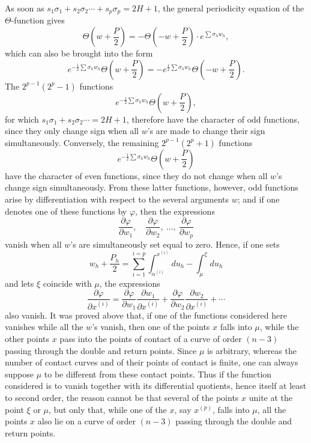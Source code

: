 \documentclass[10pt]{article}
\begin{document}
As soon as \(s_1\sigma_1+s_2\sigma_2\cdots+s_p\sigma_p=2H+1\), the general periodicity equation of the \(\Theta\)-function gives
\[
\Theta\left(w+\frac P2\right)
=-\Theta\left(-w+\frac P2\right)\cdot e^{\sum\sigma_h w_h},
\]
which can also be brought into the form
\[
e^{-\frac12\sum\sigma_h w_h}\Theta\left(w+\frac P2\right)
=
-e^{\frac12\sum\sigma_h w_h}\Theta\left(-w+\frac P2\right).
\]
The \(2^{p-1}(2^p-1)\) functions
\[
e^{-\frac12\sum\sigma_h w_h}\Theta\left(w+\frac P2\right),
\]
for which \(s_1\sigma_1+s_2\sigma_2\cdots=2H+1\), therefore have the character of odd functions, since they only change sign when all \(w\)'s are made to change their sign simultaneously. Conversely, the remaining \(2^{p-1}(2^p+1)\) functions
\[
e^{-\frac12\sum\sigma_h w_h}\Theta\left(w+\frac P2\right)
\]
have the character of even functions, since they do not change when all \(w\)'s change sign simultaneously. From these latter functions, however, odd functions arise by differentiation with respect to the several arguments \(w\); and if one denotes one of these functions by \(\varphi\), then the expressions
\[
\frac{\partial\varphi}{\partial w_1},\quad
\frac{\partial\varphi}{\partial w_2},\ \ldots,\ 
\frac{\partial\varphi}{\partial w_p}
\]
vanish when all \(w\)'s are simultaneously set equal to zero. Hence, if one sets
\[
w_h+\frac{P_h}{2}
=\sum_{i=1}^{i=p}\int_{\alpha^{(i)}}^{x^{(i)}}du_h-\int_{\mu}^{\xi}du_h
\]
and lets \(\xi\) coincide with \(\mu\), the expressions
\[
\frac{\partial\varphi}{\partial x^{(i)}}
=
\frac{\partial\varphi}{\partial w_1}\frac{\partial w_1}{\partial x^{(i)}}
+
\frac{\partial\varphi}{\partial w_2}\frac{\partial w_2}{\partial x^{(i)}}+\cdots
\]
also vanish. It was proved above that, if one of the functions considered here vanishes while all the \(w\)'s vanish, then one of the points \(x\) falls into \(\mu\), while the other points \(x\) pass into the points of contact of a curve of order \((n-3)\) passing through the double and return points. Since \(\mu\) is arbitrary, whereas the number of contact curves and of their points of contact is finite, one can always suppose \(\mu\) to be different from these contact points. Thus if the function considered is to vanish together with its differential quotients, hence itself at least to second order, the reason cannot be that several of the points \(x\) unite at the point \(\xi\) or \(\mu\), but only that, while one of the \(x\), say \(x^{(p)}\), falls into \(\mu\), all the points \(x\) also lie on a curve of order \((n-3)\) passing through the double and return points.
\end{document}
